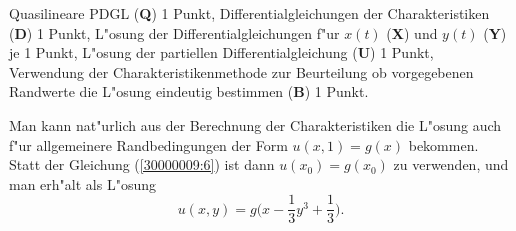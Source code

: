 \begin{bewertung}
Quasilineare PDGL ({\bf Q}) 1 Punkt,
Differentialgleichungen der Charakteristiken ({\bf D}) 1 Punkt,
L"osung der Differentialgleichungen f"ur $x(t)$ ({\bf X})
und $y(t)$ ({\bf Y}) je 1 Punkt,
L"osung der partiellen Differentialgleichung ({\bf U}) 1 Punkt,
Verwendung der Charakteristikenmethode zur Beurteilung ob
vorgegebenen Randwerte die L"osung eindeutig bestimmen ({\bf B}) 1 Punkt.
\end{bewertung}

\begin{diskussion}
Man kann nat"urlich aus der Berechnung der Charakteristiken die L"osung
auch f"ur allgemeinere Randbedingungen der Form $u(x,1)=g(x)$ bekommen.
Statt der Gleichung (\ref{30000009:6}) ist dann
$u(x_0)=g(x_0)$ zu verwenden, und man erh"alt als L"osung
\[
u(x,y)=g\biggl(
x- \frac13y^3+\frac13
\biggr).
\]
\end{diskussion}
